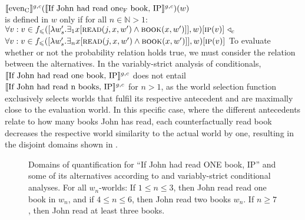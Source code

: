 \ex{}
$\intension[g,c]{even\textsubscript{C}}(\intension[g,c]{If John had read one\textsubscript{F} book, IP})(w)$\\ is defined in $w$ only if for all $n\in\mathbb{N}>1$:\\
$\forall v:v\in f_\leqslant([\lambda w'_s.\exists_1{x}[\predicate{read}(j,x,w')\land\predicate{book}(x,w')]],w)[\predicate{ip}(v)]~\lprob_c$\\\emptyfill$\forall v:v\in f_\leqslant([\lambda w'_s.\exists_n{x}[\predicate{read}(j,x,w')\land\predicate{book}(x,w')]],w)[\predicate{ip}(v)]$
\xe
To evaluate whether or not the probability relation holds true, we must consider the relation between the alternatives. In the variably-strict analysis of conditionals, $\intension[g,c]{If John had read one book, IP}$ does not entail $\intension[g,c]{If John had read n books, IP}$ for $n>1$, as the world selection function exclusively selects worlds that fulfil its respective antecedent and are maximally close to the evaluation world. In this specific case, where the different antecedents relate to how many books John has read, each counterfactually read book decreases the respective world similarity to the actual world by one, resulting in the disjoint domains shown in . 
\begin{figure}[!htb]
    \centering
    \resizebox{\linewidth}{!}{}
    \caption{Domains of quantification for \enquote{If John had read \MakeUppercase{one} book, IP} and some of its alternatives according to \textcite{Stalnaker1968} and  variably-strict conditional analyses. For all $w_n$-worlds: If $1\leqslant n\leqslant 3$, then John read read one book in $w_n$, and if $4\leqslant n\leqslant 6$, then John read two books $w_n$. If $n\geqslant 7$, then John read at least three books.}
\end{figure}
